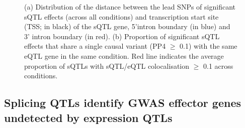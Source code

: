 \begin{figure}[H]
     \caption[Lead sQTL SNP position distribution and colocalisation between sQTLs and eQTLs]{(a) Distribution of the distance between the lead SNPs of significant sQTL effects (across all conditions) and transcription start site (TSS; in black) of the sQTL gene, 5'intron boundary (in blue) and 3' intron boundary (in red). (b) Proportion of significant sQTL effects that share a single causal variant (PP4 $\geq$ 0.1) with the same eQTL gene in the same condition. Red line indicates the average proportion of sQTLs with sQTL/eQTL colocalisation $\geq$ 0.1 across conditions.}
     \label{fig:tss_esqtl}
\end{figure}



\subsection{Splicing QTLs identify GWAS effector genes undetected by expression QTLs}

